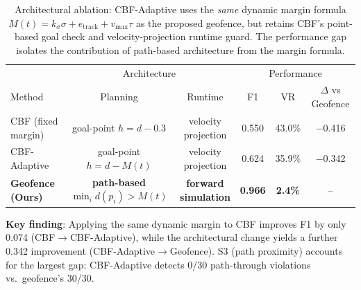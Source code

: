 \begin{table}[t]
\centering
\caption{Architectural ablation: CBF-Adaptive uses the \emph{same}
  dynamic margin formula $M(t) = k_\sigma\sigma + e_\text{track}
  + v_\text{max}\tau$ as the proposed geofence, but retains CBF's
  point-based goal check and velocity-projection runtime guard.
  The performance gap isolates the contribution of path-based
  architecture from the margin formula.}
\label{tab:ablation_arch}
\begin{tabular}{@{}l cc ccc@{}}
\toprule
& \multicolumn{2}{c}{Architecture} & \multicolumn{3}{c}{Performance} \\
\cmidrule(lr){2-3} \cmidrule(lr){4-6}
Method & Planning & Runtime & F1 & VR & $\Delta$ vs Geofence \\
\midrule
CBF (fixed margin) &
  \makecell{goal-point\\$h{=}d{-}0.3$} &
  \makecell{velocity\\projection} &
  0.550 & 43.0\% & $-$0.416 \\[4pt]
CBF-Adaptive &
  \makecell{goal-point\\$h{=}d{-}M(t)$} &
  \makecell{velocity\\projection} &
  0.624 & 35.9\% & $-$0.342 \\[4pt]
\textbf{Geofence (Ours)} &
  \makecell{\textbf{path-based}\\$\min_i d(p_i){>}M(t)$} &
  \makecell{\textbf{forward}\\
  \textbf{simulation}} &
  \textbf{0.966} & \textbf{2.4\%} & {--} \\
\bottomrule
\end{tabular}
\vspace{1mm}

{\footnotesize
\textbf{Key finding}: Applying the same dynamic margin to CBF improves
F1 by only 0.074 (CBF$\to$CBF-Adaptive), while the architectural change
yields a further 0.342 improvement (CBF-Adaptive$\to$Geofence).
S3 (path proximity) accounts for the largest gap: CBF-Adaptive
detects 0/30 path-through violations vs.\ geofence's 30/30.}
\end{table}

